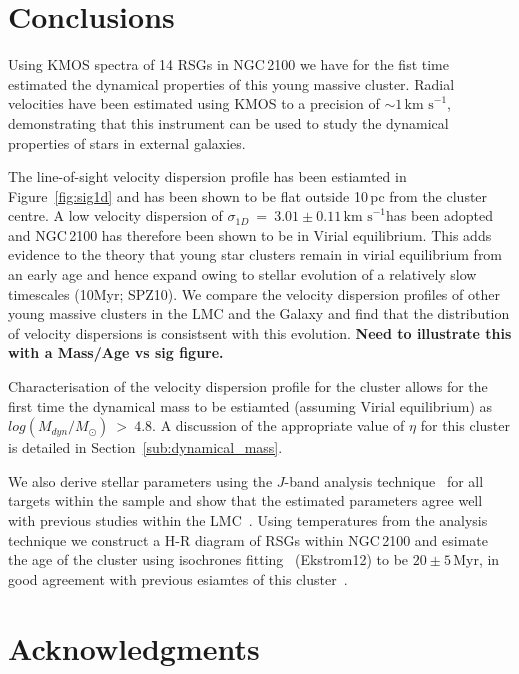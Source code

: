 \documentclass[useAMS,usenatbib]{mn2e}
\def\kms{$\mbox{km s}^{-1}$}
\begin{document}

\section{Conclusions} %
\label{sec:conclusions}

Using KMOS spectra of 14 RSGs in NGC\,2100 we have for the fist time estimated the dynamical properties of this young massive cluster.
Radial velocities have been estimated using KMOS to a precision of $\sim1$\,\kms, demonstrating that this instrument can be used to study the dynamical properties of stars in external galaxies.

The line-of-sight velocity dispersion profile has been estiamted in Figure~\ref{fig:sig1d} and has been shown to be flat outside 10\,pc from the cluster centre.
A low velocity dispersion of $\sigma_{1D}~=~3.01\pm0.11\,$\kms has been adopted and NGC\,2100 has therefore been shown to be in Virial equilibrium.
This adds evidence to the theory that young star clusters remain in virial equilibrium from an early age and hence expand owing to stellar evolution of a relatively slow timescales (10Myr; SPZ10).
We compare the velocity dispersion profiles of other young massive clusters in the LMC and the Galaxy and find that the distribution of velocity dispersions is consistsent with this evolution.
\textbf{Need to illustrate this with a Mass/Age vs sig figure.}

Characterisation of the velocity dispersion profile for the cluster allows for the first time the dynamical mass to be estiamted (assuming Virial equilibrium) as $log(M_{dyn}/M_{\odot})~>~4.8$.
A discussion of the appropriate value of $\eta$ for this cluster is detailed in Section~\ref{sub:dynamical_mass}.

We also derive stellar parameters using the $J$-band analysis technique~\citep{2010MNRAS.407.1203D} for all targets within the sample and show that the estimated parameters agree well with previous studies within the LMC~\citep{2015ApJ...806...21D}.
Using temperatures from the analysis technique we construct a H-R diagram of RSGs within NGC\,2100 and esimate the age of the cluster using isochrones fitting~\citep{2013A&A...558A.103G} (Ekstrom12) to be $20\pm5\,$Myr, in good agreement with previous esiamtes of this cluster~\citep{2015A&A...575A..62N}.



\section*{Acknowledgments}
\end{document}
